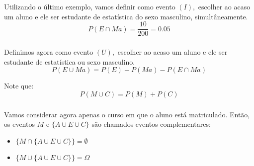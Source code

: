 \documentclass[14pt,aspectratio=1610]{beamer}
\begin{document}
\begin{frame}{}
\frametitle{}
\begin{block}{}
\justifying
Utilizando o último exemplo, vamos definir como evento $(I),$ escolher ao acaso um aluno e ele ser estudante de estatística do sexo masculino, simultâneamente.
$$P(E\cap Ma)=\dfrac{10}{200}=0.05$$
\end{block}
\end{frame}

\begin{frame}{}
\frametitle{}
\begin{block}{}
\justifying
Definimos agora como evento $(U),$ escolher ao acaso um aluno e ele ser estudante de estatística ou sexo masculino.
$$P(E\cup Ma)=P(E)+P(Ma)-P(E\cap Ma)$$

Note que: $$P(M\cup C)=P(M)+P(C)$$
\end{block}
\end{frame}

\begin{frame}{}
\frametitle{}
\begin{block}{}
\justifying
Vamos considerar agora apenas o curso em que o aluno está matriculado. Então, os eventos $M$ e $\{A\cup E \cup C\}$ são chamados eventos complementares:
\begin{itemize}
\item $\{M\cap \{A\cup E \cup C\}\}=\emptyset$
\item $\{M\cup \{A\cup E \cup C\}\}=\Omega$
\end{itemize}
\end{block}
\end{frame}
\end{document}
